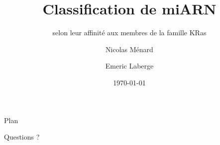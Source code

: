 \documentclass[10pt,aspectratio=169]{beamer}
\title{Classification de miARN}
\subtitle{selon leur affinité aux membres de la famille KRas}
\author{Nicolas Ménard \and Emeric Laberge}
\institute{IFT6292 / BIN6001 -- Bioinformatique structurale}
\date{\today}
\begin{document}
\begin{frame}
	\titlepage
\end{frame}

\begin{frame}{Plan}
	\tableofcontents
\end{frame}








\begin{frame}[standout]
Questions ?
\end{frame}
\end{document}

